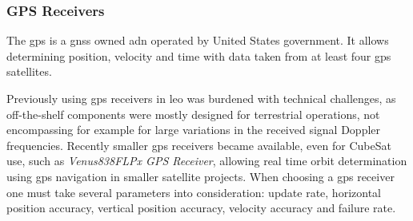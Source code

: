 

    \subsubsection{GPS Receivers}
        The \ac{gps} is a \ac{gnss} owned adn operated by United States government. It allows determining position, velocity and time with data taken from at least four \ac{gps} satellites.

        Previously using \ac{gps} receivers in \ac{leo} was burdened with technical challenges, as off-the-shelf components were mostly designed for terrestrial operations, not encompassing for example for large variations in the received signal Doppler frequencies. Recently smaller \ac{gps} receivers became available, even for CubeSat use, such as \textit{Venus838FLPx GPS Receiver}\cite{gpsdatasheet}, allowing real time orbit determination using \ac{gps} navigation in smaller satellite projects.\cite{gomes2007real} When choosing a \ac{gps} receiver one must take several parameters into consideration: update rate, horizontal position accuracy, vertical position accuracy, velocity accuracy and failure rate.
        


